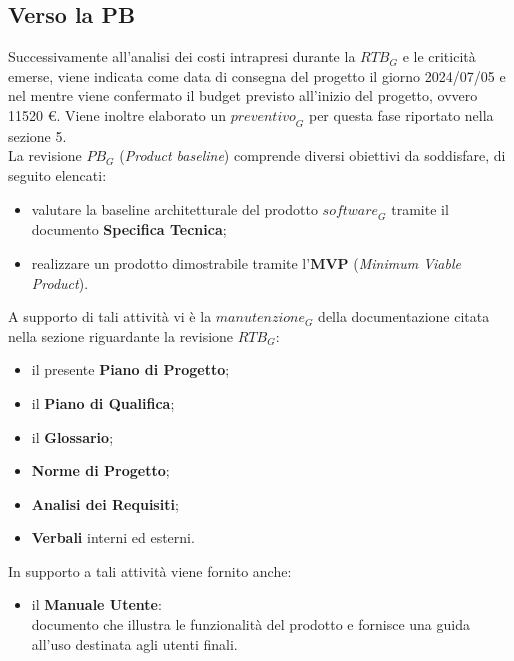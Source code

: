 \newpage

\newpage

\newpage

\newpage

\newpage

\newpage

\newpage

\newpage

\newpage

\newpage

\subsection{Verso la PB}
Successivamente all'analisi dei costi intrapresi durante la $\textit{RTB}_G$ e le criticità emerse, viene indicata come data di consegna del progetto il giorno 2024/07/05 e nel mentre viene confermato il budget previsto all'inizio del progetto, ovvero 11520 \euro. Viene inoltre elaborato un $\textit{preventivo}_G$ per questa fase riportato nella sezione 5.\\
La revisione $\textit{PB}_G$ (\emph{Product baseline}) comprende diversi obiettivi da soddisfare, di seguito elencati:
\begin{itemize}
    \item valutare la baseline architetturale del prodotto $\textit{software}_G$ tramite il documento \textbf{Specifica Tecnica};
    \item realizzare un prodotto dimostrabile tramite l'\textbf{MVP} (\emph{Minimum Viable Product}).
\end{itemize}
A supporto di tali attività vi è la $\textit{manutenzione}_G$ della documentazione citata nella sezione riguardante la revisione $\textit{RTB}_G$:
\begin{itemize}
    \item il presente \textbf{Piano di Progetto};
    \item il \textbf{Piano di Qualifica};
    \item il \textbf{Glossario};
    \item \textbf{Norme di Progetto};
    \item \textbf{Analisi dei Requisiti};
    \item \textbf{Verbali} interni ed esterni.
\end{itemize}
In supporto a tali attività viene fornito anche:
\begin{itemize}
    \item il \textbf{Manuale Utente}:\\
    documento che illustra le funzionalità del prodotto e fornisce una guida all'uso destinata agli utenti finali.
\end{itemize}
